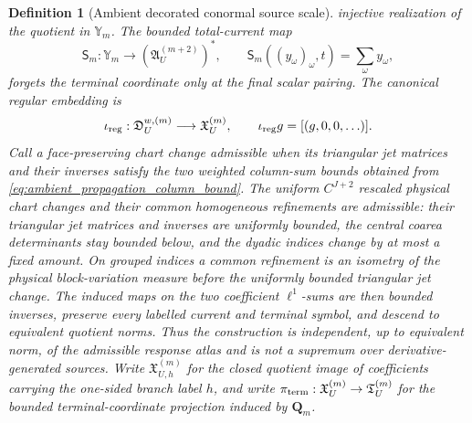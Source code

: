 \documentclass[11pt]{amsart}
\theoremstyle{compactplain}
\theoremstyle{compactdefinition}
\newtheorem{definition}[theorem]{Definition}
\theoremstyle{compactremark}
\begin{document}
\begin{definition}[Ambient decorated conormal source scale]
injective realization of the quotient in \(\mathbb Y_m\).  The bounded total-current map
\[
 \mathsf S_m:\mathbb Y_m\longrightarrow
   (\mathfrak A_U^{(m+2)})^*,\qquad
 \mathsf S_m((y_\omega)_\omega,t)=\sum_\omega y_\omega,
\]
forgets the terminal coordinate only at the final scalar pairing.
The canonical regular embedding is
\[
 \iota_{\rm reg}:\mathfrak D_U^{w,(m)}
 \longrightarrow\mathfrak X_U^{(m)},\qquad
 \iota_{\rm reg}g=[(g,0,0,\ldots)].
\]
Call a face-preserving chart change \emph{admissible} when its
triangular jet matrices and their inverses satisfy the two weighted column-sum
bounds obtained from \eqref{eq:ambient_propagation_column_bound}.  The
uniform \(C^{J+2}\) rescaled physical chart changes and their common
homogeneous refinements are admissible: their triangular jet matrices and
inverses are uniformly bounded, the central coarea determinants stay bounded
below, and the dyadic indices change by at most a fixed amount.  On grouped
indices a common refinement is an isometry of the physical block-variation
measure before the uniformly bounded triangular jet change.  The induced maps on the two coefficient
\(\ell^1\)-sums are then bounded inverses, preserve every labelled current and
terminal symbol, and descend to equivalent quotient norms.  Thus the construction is
independent, up to equivalent norm, of the admissible response atlas and is not a supremum over
derivative-generated sources.  Write \(\mathfrak X_{U,h}^{(m)}\) for the closed
quotient image of coefficients carrying the one-sided branch label \(h\), and
write
\(\pi_{\rm term}:\mathfrak X_U^{(m)}\to\mathfrak T_U^{(m)}\)
for the bounded terminal-coordinate projection induced by \(\mathbf Q_m\).
\end{definition}
\end{document}
